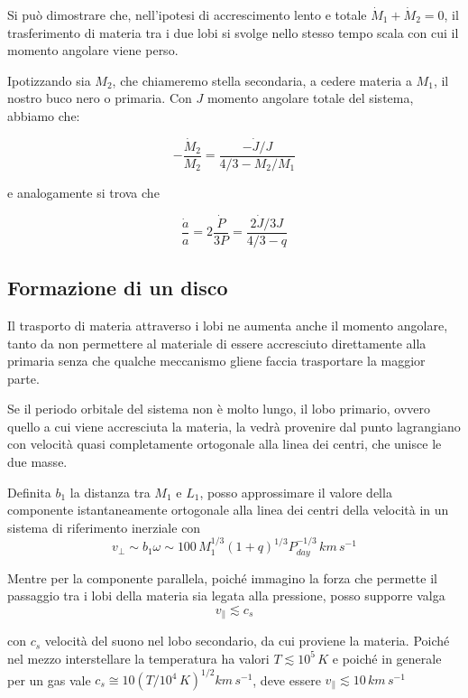 \documentclass[a4paperbi]{article}
\begin{document}
	Si può dimostrare che, nell'ipotesi di accrescimento lento e totale $\dot{M}_1+\dot{M}_2=0$, il trasferimento di materia tra i due lobi si svolge nello stesso tempo scala con cui il momento angolare viene perso.
	
	Ipotizzando sia $M_2$, che chiameremo stella secondaria, a cedere materia a $M_1$, il nostro buco nero o primaria. Con $J$ momento angolare totale del sistema, abbiamo che:
	
	\begin{equation}
		-\frac{\dot{M}_2}{M_2}=\frac{-\dot{J}/J}{4/3-M_2/M_1}
	\end{equation}
	
	e analogamente si trova che

	\begin{equation}
		\frac{\dot{a}}{a}=2\frac{\dot{P}}{3P}=\frac{2\dot{J}/3J}{4/3-q}
	\end{equation}
	
\subsection{Formazione di un disco}
	Il trasporto di materia attraverso i lobi ne aumenta anche il momento angolare, tanto da non permettere al materiale di essere accresciuto direttamente alla primaria senza che qualche meccanismo gliene faccia trasportare la maggior parte.
	
	Se il periodo orbitale del sistema non è molto lungo, il lobo primario, ovvero quello a cui viene accresciuta la materia, la vedrà provenire dal punto lagrangiano con velocità quasi completamente ortogonale alla linea dei centri, che unisce le due masse. 
	
	Definita $b_1$ la distanza tra $M_1$ e $L_1$, posso approssimare il valore della componente istantaneamente ortogonale alla linea dei centri della velocità in un sistema di riferimento inerziale con
	\begin{equation}
		v_\perp\sim b_1\omega\sim 100\,M_1^{1/3}(1+q)^{1/3}P^{-1/3}_{day}\,km\,s^{-1}
	\end{equation}  
	
	Mentre per la componente parallela, poiché immagino la forza che permette il passaggio tra i lobi della materia sia legata alla pressione, posso supporre valga
	\begin{equation}
		v_\parallel \lesssim c_{s}
	\end{equation}
	
	con $c_{s}$ velocità del suono nel lobo secondario, da cui proviene la materia. Poiché nel mezzo interstellare la temperatura ha valori $T\lesssim10^5\,K$ e poiché in generale per un gas vale $c_s\cong10(T/10^4\,K)^{1/2}km\,s^{-1}$, deve essere $v_\parallel\lesssim10\,km\,s^{-1}$
	
\end{document}
